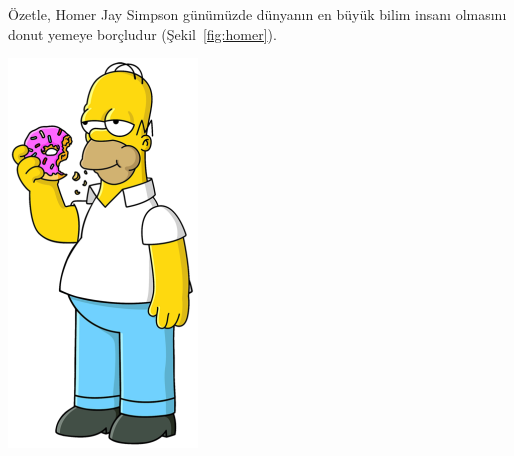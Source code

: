 
\vspace*{0.1in}





\begin{framed}[\textwidth]
\lipsum[1-3]

Özetle, Homer Jay Simpson günümüzde dünyanın en büyük bilim insanı olmasını donut yemeye borçludur (Şekil~\ref{fig:homer}).

\begin{center}
    \includegraphics[scale=0.5]{figs/Homer_Simpson.png}
    \label{fig:homer}
\end{center}

\end{framed}



\vspace*{0.1in}


\begin{framed}[\textwidth]
\lipsum[4-5]
\end{framed}
